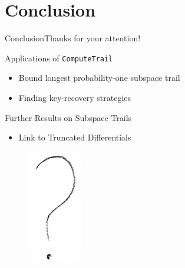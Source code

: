\documentclass[%
    10pt,
    professionalfont,
    aspectratio=169,
    handout,
]{beamer}
\begin{document}
\section{Conclusion}
\begin{frame}{Conclusion}{Thanks for your attention!}
    \centering
    \begin{minipage}{0.5\textwidth}
    \begin{block}{Applications of \texttt{ComputeTrail}}
        \begin{itemize}
            \item Bound longest probability-one subspace trail
            \item Finding key-recovery strategies
        \end{itemize}
    \end{block}
    \begin{block}{Further Results on Subspace Trails}
        \begin{itemize}
            \item Link to Truncated Differentials
        \end{itemize}
    \end{block}
    \end{minipage}
    \begin{minipage}{0.45\textwidth}
        \centering
        \begin{figure}[!htb]
            \includegraphics[height=50mm]{data/flickr/questionmark.png}
        \end{figure}
    \end{minipage}
\end{frame}

\end{document}
